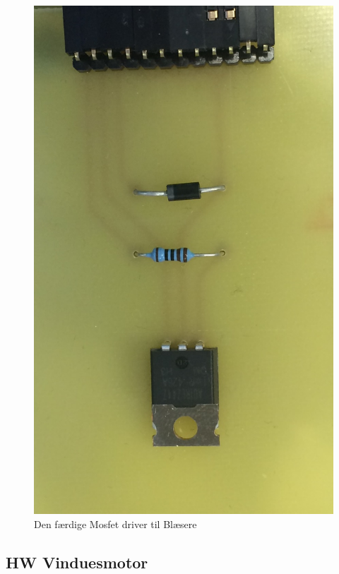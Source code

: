 \begin{figure}[h]
\centering 
\includegraphics[width={\textwidth-5cm}, trim=0 0 0 0, clip=true] {../fig/VentilationPrintBillede} 
\caption{Den færdige Mosfet driver til Blæsere}
\label{fig:blaesere_print}
\end{figure}

\clearpage

\subsection{HW Vinduesmotor}

